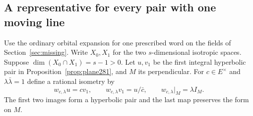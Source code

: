 \documentclass[a4paper,11pt]{article}
\theoremstyle{definition}
\theoremstyle{remark}
\numberwithin{equation}{section}
\begin{document}
\subsection{A representative for every pair with one moving line}\label{nav:V-51}
Use the ordinary orbital expansion for one prescribed
word on the fields of Section~\ref{sec:missing}. Write \(X_0,X_1\)
for the two \(s\)-dimensional isotropic spaces. Suppose
\(\dim(X_0\cap X_1)=s-1>0\). Let \(u,v_1\) be the first
integral hyperbolic pair in Proposition~\ref{prop:plane281},
and \(M\) its perpendicular. For \(c\in E^\times\) and
\(\lambda\bar\lambda=1\) define a rational isometry by
\[
    w_{c,\lambda}u=c v_1,\qquad
    w_{c,\lambda}v_1=u/\bar c,\qquad
    w_{c,\lambda}|_M=\lambda I_M .
\]
The first two images form a hyperbolic pair and the last
map preserves the form on \(M\).
\end{document}
